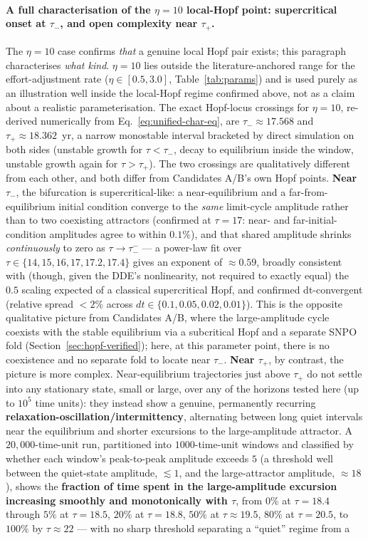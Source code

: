 \documentclass[twocolumn,10pt]{article}
\begin{document}
\paragraph{A full characterisation of the $\eta=10$ local-Hopf point: supercritical onset at $\tau_-$, and open complexity near $\tau_+$.} The $\eta=10$ case confirms \emph{that} a genuine local Hopf pair exists; this paragraph characterises \emph{what kind}. $\eta=10$ lies outside the literature-anchored range for the effort-adjustment rate ($\eta\in[0.5,3.0]$, Table~\ref{tab:params}) and is used purely as an illustration well inside the local-Hopf regime confirmed above, not as a claim about a realistic parameterisation. The exact Hopf-locus crossings for $\eta=10$, re-derived numerically from Eq.~\eqref{eq:unified-char-eq}, are $\tau_-\approx17.568$ and $\tau_+\approx18.362$~yr, a narrow monostable interval bracketed by direct simulation on both sides (unstable growth for $\tau<\tau_-$, decay to equilibrium inside the window, unstable growth again for $\tau>\tau_+$). The two crossings are qualitatively different from each other, and both differ from Candidates A/B's own Hopf points. \textbf{Near $\tau_-$}, the bifurcation is supercritical-like: a near-equilibrium and a far-from-equilibrium initial condition converge to the \emph{same} limit-cycle amplitude rather than to two coexisting attractors (confirmed at $\tau=17$: near- and far-initial-condition amplitudes agree to within $0.1\%$), and that shared amplitude shrinks \emph{continuously} to zero as $\tau\to\tau_-^-$ --- a power-law fit over $\tau\in\{14,15,16,17,17.2,17.4\}$ gives an exponent of $\approx0.59$, broadly consistent with (though, given the DDE's nonlinearity, not required to exactly equal) the $0.5$ scaling expected of a classical supercritical Hopf, and confirmed dt-convergent (relative spread $<2\%$ across $dt\in\{0.1,0.05,0.02,0.01\}$). This is the opposite qualitative picture from Candidates A/B, where the large-amplitude cycle coexists with the stable equilibrium via a subcritical Hopf and a separate SNPO fold (Section~\ref{sec:hopf-verified}); here, at this parameter point, there is no coexistence and no separate fold to locate near $\tau_-$. \textbf{Near $\tau_+$}, by contrast, the picture is more complex. Near-equilibrium trajectories just above $\tau_+$ do not settle into any stationary state, small or large, over any of the horizons tested here (up to $10^5$ time units): they instead show a genuine, permanently recurring \textbf{relaxation-oscillation/intermittency}, alternating between long quiet intervals near the equilibrium and shorter excursions to the large-amplitude attractor. A $20{,}000$-time-unit run, partitioned into $1000$-time-unit windows and classified by whether each window's peak-to-peak amplitude exceeds $5$ (a threshold well between the quiet-state amplitude, $\lesssim1$, and the large-attractor amplitude, $\approx18$), shows the \textbf{fraction of time spent in the large-amplitude excursion increasing smoothly and monotonically with $\tau$}, from $0\%$ at $\tau=18.4$ through $5\%$ at $\tau=18.5$, $20\%$ at $\tau=18.8$, $50\%$ at $\tau\approx19.5$, $80\%$ at $\tau=20.5$, to $100\%$ by $\tau\approx22$ --- with no sharp threshold separating a ``quiet'' regime from a 
\end{document}
